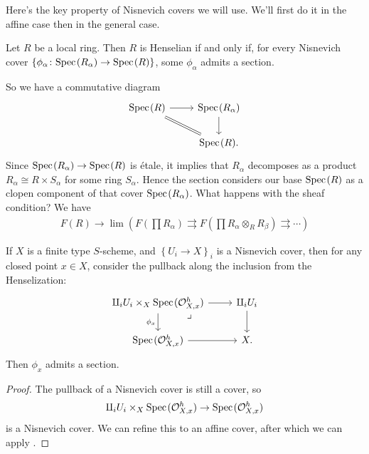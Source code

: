 \documentclass[11pt,openany]{book}
\begin{document}
Here's the key property of Nisnevich covers we will use. We'll first do it in the affine case then in the general case.

\begin{proposition}
\label{prop:Nis-cover-surj-on-sections-affine} Let $R$ be a local ring.
Then $R$ is Henselian if and only if, for every Nisnevich cover $\{\phi_\alpha \colon \text{Spec}\hspace{0.1em}(R_\alpha) \to \text{Spec}\hspace{0.1em}(R)\}$, some $\phi_\alpha$ admits a section.
\end{proposition}

So we have a commutative diagram
\[ \begin{tikzcd}
    \Spec(R)\rar\ar[dr,equal] & \Spec(R_\alpha)\dar\\
     & \Spec(R).
\end{tikzcd} \]
%
Since $\text{Spec}\hspace{0.1em}(R_\alpha) \to \text{Spec}\hspace{0.1em}(R)$ is \'etale, it implies that $R_\alpha$ decomposes as a product $R_\alpha \cong R \times S_\alpha$ for some ring $S_\alpha$. Hence the section considers our base $\text{Spec}\hspace{0.1em}(R)$ as a clopen component of that cover $\text{Spec}\hspace{0.1em}(R_\alpha)$. What happens with the sheaf condition? We have
\begin{align*}
    F(R) \to \lim \left( F(\prod R_\alpha) \rightrightarrows F(\prod R_\alpha \otimes_R R_\beta) \rightrightarrows \cdots \right)
\end{align*}


\begin{proposition}[{\cite[p.~95]{MV}}]
\label{prop:Nis-cover-surj-on-sections}
If $X$ is a finite type $S$-scheme, and $\left\{ U_i \to X \right\}_i$ is a Nisnevich cover, then for any closed point $x\in X$, consider the pullback along the inclusion from the Henselization:
\[ \begin{tikzcd}
    \amalg_i U_i \times_X \Spec(\mathcal{O}_{X,x}^h)\dar["\phi_x" left]\rar\pb  & \amalg_i U_i\dar\\
    \Spec(\mathcal{O}_{X,x}^h)\rar & X.
\end{tikzcd} \]
Then $\phi_x$ admits a section.
\end{proposition}
\begin{proof} The pullback of a Nisnevich cover is still a cover, so
\begin{align*}
    \amalg_i U_i \times_X \text{Spec}\hspace{0.1em}(\mathcal{O}_{X,x}^h) \to \text{Spec}\hspace{0.1em}(\mathcal{O}_{X,x}^h)
\end{align*}
is a Nisnevich cover. We can refine this to an affine cover, after which we can apply .
\end{proof}
\end{document}
